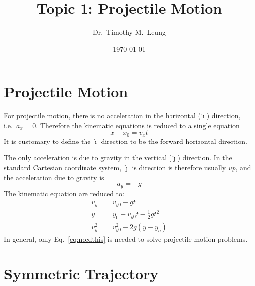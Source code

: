 \documentclass{../../oss-handout}
\title{Topic 1: Projectile Motion}
\author{Dr.\ Timothy M.\ Leung}
\date{\today}
\begin{document}
\thispagestyle{title}
\gentitle

\section{Projectile Motion}

For projectile motion, there is no acceleration in the horizontal
($\bm{\hat{\imath}}$) direction, i.e.\ $a_x=0$. Therefore the kinematic
equations is reduced to a single equation
\begin{equation}
  x-x_0=v_xt
\end{equation}
It is customary to define the $\bm{\hat{\imath}}$ direction to be the forward
horizontal direction.

The only acceleration is due to gravity in the vertical ($\bm{\hat{\jmath}}$)
direction. In the standard Cartesian coordinate system, $\bm{\hat{\jmath}}$ is
direction is therefore usually \emph{up}, and the acceleration due to gravity is
\begin{equation}
  a_y=-g
\end{equation}
The kinematic equation are reduced to:
\begin{align}
  v_y&=v_{y0}-gt\\
  y&=y_0+v_{y0}t-\frac12 gt^2\label{eq:needthis}\\
  v_y^2&=v_{y0}^2-2g(y-y_o)
\end{align}
In general, only Eq.~\ref{eq:needthis} is needed to solve projectile motion
problems.

\section{Symmetric Trajectory}
\end{document}
